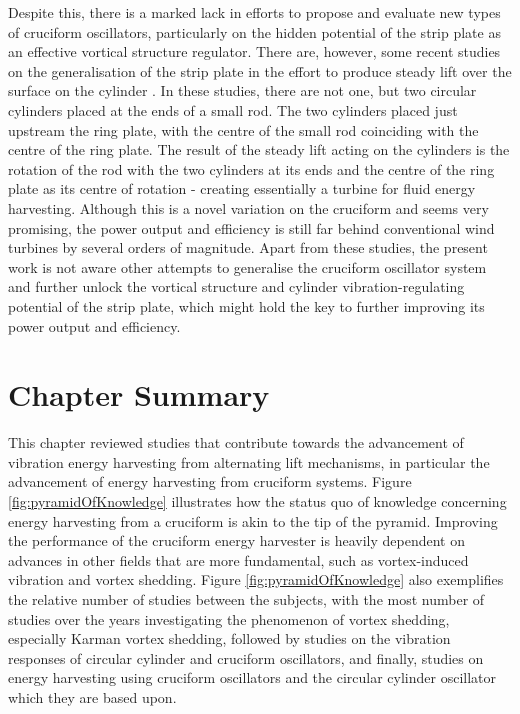\documentclass[oneside]{utmthesis}
\begin{document}
Despite this, there is a marked lack in efforts to propose and evaluate new types of cruciform oscillators, particularly on the hidden potential of the strip plate as an effective vortical structure regulator. There are, however, some recent studies on the generalisation of the strip plate in the effort to produce steady lift over the surface on the cylinder \citep{Hemsuwan2018a,Hemsuwan2018b,Hemsuwan2018c,Hemsuwan2018d}. In these studies, there are not one, but two circular cylinders placed at the ends of a small rod. The two cylinders placed just upstream the ring plate, with the centre of the small rod coinciding with the centre of the ring plate. The result of the steady lift acting on the cylinders is the rotation of the rod with the two cylinders at its ends and the centre of the ring plate as its centre of rotation - creating essentially a turbine for fluid energy harvesting. Although this is a novel variation on the cruciform and seems very promising, the power output and efficiency is still far behind conventional wind turbines by several orders of magnitude. Apart from these studies, the present work is not aware other attempts to generalise the cruciform oscillator system and further unlock the vortical structure and cylinder vibration-regulating potential of the strip plate, which might hold the key to further improving its power output and efficiency.

\section{Chapter Summary}
This chapter reviewed studies that contribute towards the advancement of vibration energy harvesting from alternating lift mechanisms, in particular the advancement of energy harvesting from cruciform systems. Figure \ref{fig:pyramidOfKnowledge} illustrates how the status quo of knowledge concerning energy harvesting from a cruciform is akin to the tip of the pyramid. Improving the performance of the cruciform energy harvester is heavily dependent on advances in other fields that are more fundamental, such as vortex-induced vibration and vortex shedding. Figure \ref{fig:pyramidOfKnowledge} also exemplifies the relative number of studies between the subjects, with the most number of studies over the years investigating the phenomenon of vortex shedding, especially Karman vortex shedding, followed by studies on the vibration responses of circular cylinder and cruciform oscillators, and finally, studies on energy harvesting using cruciform oscillators and the circular cylinder oscillator which they are based upon.
\end{document}
